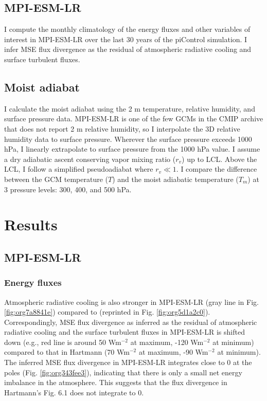 \documentclass[11pt]{article}
\begin{document}
\subsection{MPI-ESM-LR}
\label{sec:org58bd427}
I compute the monthly climatology of the energy fluxes and other variables of interest in MPI-ESM-LR over the last 30 years of the piControl simulation. I infer MSE flux divergence as the residual of atmospheric radiative cooling and surface turbulent fluxes.

\subsection{Moist adiabat}
\label{sec:orgc9cefe0}
I calculate the moist adiabat using the 2 m temperature, relative humidity, and surface pressure data. MPI-ESM-LR is one of the few GCMs in the CMIP archive that does not report 2 m relative humidity, so I interpolate the 3D relative humidity data to surface pressure. Wherever the surface pressure exceeds 1000 hPa, I linearly extrapolate to surface pressure from the 1000 hPa value. I assume a dry adiabatic ascent conserving vapor mixing ratio (\(r_v\)) up to LCL. Above the LCL, I follow a simplified pseudoadiabat where \(r_v \ll 1\). I compare the difference between the GCM temperature (\(T\)) and the moist adiabatic temperature (\(T_m\)) at 3 pressure levels: 300, 400, and 500 hPa.

\section{Results}
\label{sec:org7795033}
\subsection{MPI-ESM-LR}
\label{sec:org2efab71}
\subsubsection{Energy fluxes}
\label{sec:orge5788bd}
Atmospheric radiative cooling is also stronger in MPI-ESM-LR (gray line in Fig. \ref{fig:org7a8841e}) compared to \cite{hartmann_global_2016} (reprinted in Fig. \ref{fig:org5d1a2c0}). Correspondingly, MSE flux divergence as inferred as the residual of atmospheric radiative cooling and the surface turbulent fluxes in MPI-ESM-LR is shifted down (e.g., red line is around 50 Wm\(^{-2}\) at maximum, -120 Wm\(^{-2}\) at minimum) compared to that in Hartmann (70 Wm\(^{-2}\) at maximum, -90 Wm\(^{-2}\) at minimum). The inferred MSE flux divergence in MPI-ESM-LR integrates close to 0 at the poles (Fig. \ref{fig:org343fee3}), indicating that there is only a small net energy imbalance in the atmosphere. This suggests that the flux divergence in Hartmann's Fig. 6.1 does not integrate to 0.
\end{document}
